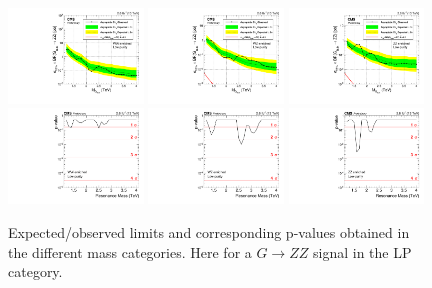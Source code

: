 \begin{figure}[h!]
\centering
\includegraphics[width=0.32\textwidth]{figures/analysis/search1/AN-15-211/limits/brazilianFlag_BulkZZ_WWLP_13TeV_wPDF.pdf}
\includegraphics[width=0.32\textwidth]{figures/analysis/search1/AN-15-211/limits/brazilianFlag_BulkZZ_WZLP_13TeV_wPDF.pdf}
\includegraphics[width=0.32\textwidth]{figures/analysis/search1/AN-15-211/limits/brazilianFlag_BulkZZ_ZZLP_13TeV_wPDF.pdf}\\
\includegraphics[width=0.32\textwidth]{figures/analysis/search1/AN-15-211/pvalues/pvalue_BulkZZinWW_low_purity.pdf}
\includegraphics[width=0.32\textwidth]{figures/analysis/search1/AN-15-211/pvalues/pvalue_BulkZZinWZ_low_purity.pdf}
\includegraphics[width=0.32\textwidth]{figures/analysis/search1/AN-15-211/pvalues/pvalue_BulkZZinZZ_low_purity.pdf}
\caption{Expected/observed limits and corresponding p-values obtained in the different mass categories. Here for a $G\rightarrow ZZ$ signal in the LP category.}
\label{fig:searchI:Limits_LPBulkZZ}
\end{figure}

